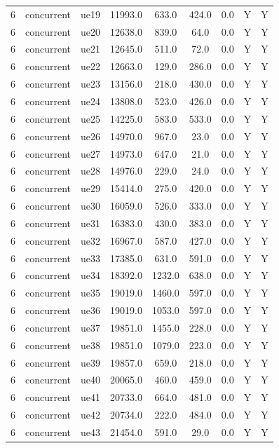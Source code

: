 \begin{table}[ht]
\begin{tabular}{|c|c|c|c|c|c|c|c|c|}
6 & concurrent & ue19 & 11993.0 & 633.0 & 424.0 & 0.0 & Y & Y \\
6 & concurrent & ue20 & 12638.0 & 839.0 & 64.0 & 0.0 & Y & Y \\
6 & concurrent & ue21 & 12645.0 & 511.0 & 72.0 & 0.0 & Y & Y \\
6 & concurrent & ue22 & 12663.0 & 129.0 & 286.0 & 0.0 & Y & Y \\
6 & concurrent & ue23 & 13156.0 & 218.0 & 430.0 & 0.0 & Y & Y \\
6 & concurrent & ue24 & 13808.0 & 523.0 & 426.0 & 0.0 & Y & Y \\
6 & concurrent & ue25 & 14225.0 & 583.0 & 533.0 & 0.0 & Y & Y \\
6 & concurrent & ue26 & 14970.0 & 967.0 & 23.0 & 0.0 & Y & Y \\
6 & concurrent & ue27 & 14973.0 & 647.0 & 21.0 & 0.0 & Y & Y \\
6 & concurrent & ue28 & 14976.0 & 229.0 & 24.0 & 0.0 & Y & Y \\
6 & concurrent & ue29 & 15414.0 & 275.0 & 420.0 & 0.0 & Y & Y \\
6 & concurrent & ue30 & 16059.0 & 526.0 & 333.0 & 0.0 & Y & Y \\
6 & concurrent & ue31 & 16383.0 & 430.0 & 383.0 & 0.0 & Y & Y \\
6 & concurrent & ue32 & 16967.0 & 587.0 & 427.0 & 0.0 & Y & Y \\
6 & concurrent & ue33 & 17385.0 & 631.0 & 591.0 & 0.0 & Y & Y \\
6 & concurrent & ue34 & 18392.0 & 1232.0 & 638.0 & 0.0 & Y & Y \\
6 & concurrent & ue35 & 19019.0 & 1460.0 & 597.0 & 0.0 & Y & Y \\
6 & concurrent & ue36 & 19019.0 & 1053.0 & 597.0 & 0.0 & Y & Y \\
6 & concurrent & ue37 & 19851.0 & 1455.0 & 228.0 & 0.0 & Y & Y \\
6 & concurrent & ue38 & 19851.0 & 1079.0 & 223.0 & 0.0 & Y & Y \\
6 & concurrent & ue39 & 19857.0 & 659.0 & 218.0 & 0.0 & Y & Y \\
6 & concurrent & ue40 & 20065.0 & 460.0 & 459.0 & 0.0 & Y & Y \\
6 & concurrent & ue41 & 20733.0 & 664.0 & 481.0 & 0.0 & Y & Y \\
6 & concurrent & ue42 & 20734.0 & 222.0 & 484.0 & 0.0 & Y & Y \\
6 & concurrent & ue43 & 21454.0 & 591.0 & 29.0 & 0.0 & Y & Y \\

\end{tabular}
\end{table}
